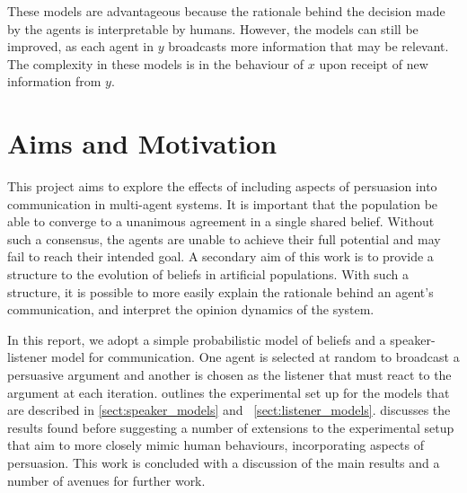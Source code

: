 These models are advantageous because the rationale behind the decision made by the agents is interpretable by humans. However, the models can still be improved, as each agent in $y$ broadcasts more information that may be relevant. The complexity in these models is in the behaviour of $x$ upon receipt of new information from $y$. 


\fancyfoot[RE,LO]{\rightmark}
\section{Aims and Motivation}

This project aims to explore the effects of including aspects of persuasion into communication in multi-agent systems. It is important that the population be able to converge to a unanimous agreement in a single shared belief. Without such a consensus, the agents are unable to achieve their full potential and may fail to reach their intended goal. A secondary aim of this work is to provide a structure to the evolution of beliefs in artificial populations. With such a structure, it is possible to more easily explain the rationale behind an agent's communication, and interpret the opinion dynamics of the system. 



In this report, we adopt a simple probabilistic model of beliefs and a speaker-listener model for communication. One agent is selected at random to broadcast a persuasive argument and another is chosen as the listener that must react to the argument at each iteration.  outlines the experimental set up for the models that are described in \cref{sect:speaker_models} and ~\cref{sect:listener_models}.  discusses the results found before suggesting a number of extensions to the experimental setup that aim to more closely mimic human behaviours, incorporating aspects of persuasion. This work is concluded with a discussion of the main results and a number of avenues for further work. 









